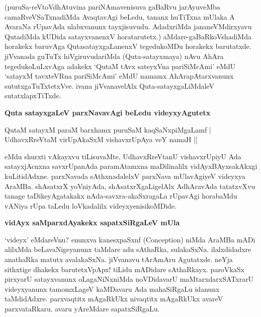 \noindent
(puruSa-reVtoVdhAtuvina pariNAmavenisuva gaBaRvu jarAyuveMba camaR\-veVSaTxnadiMda Avaqta\-vAgi beLedu, tananx huTiTxna mUlaka A AvaraNa rUpavAda ulabxvanunx tayxjisuvudu. AdadxriMda jananeVMdirx\-yavu QutadiMda kUDida satayx\-vanenxV horatarutetx.) aMdare-gaBaRkoVshadiMda horakekx baruvAga Quta\-satayx\-gaLanenxV tegedu\-koMDu horakekx barutatxde. jiVvanada guTuTx hiVgiruvudariMda (Quta-satayxmaya) nAvu AhAra tegedukoLuLxvAga adakekx `QutaM tAvx sateyxVna pariSiMcAmi' eMdU `satayxM tavxteVRna pariSiM\-cAmi'\label{87} eMdU namamx AhArapAtarxvanunx sututxgaTuTxtetxVve. ivana jiVvanavelAlx Quta-satayxgaLiMdaleV sutatx\-lapxTiTxde.

{\bigskip
\noindent
{\large\bf Quta satayxgaLeV parxNavavAgi beLedu videyxyAgutetx}}\label{page87}
\smallskip

\begin{shloka}
QutaM satayxM paraM barxhamx puruSaM kaqSaNxpiMgaLamf |\\\label{87}
UdhavxRreVtaM virUpAkaSxM vishavxrUpAya veY namaH ||
\end{shloka}

\noindent
eMdu shurxti vAkayxvu tiLisuvaMte, UdhavxRreVtanU vishavxrUpiyU Ada satayxjAcnxna savxrUpanAda para\-mAtamxna maDilinalilx vidAyxBAyxsakAkxgi kuLitidAdxne. parxNavada sAthxnadalelxV parxNava mUlavAgiyeV videyxya AraMBa. shAsatxrX yoVniyAda, shAsatxrXgaLigelAlx AdhAravAda tatatxvXvu tanage taDikeyAgatakakx nAda-savxra-akaSxra\-gaLa rUpavAgi horabaMdu vANiya rUpa taLedu loVkadalilx videyxyenisikoMDide.

{\bigskip
\noindent
{\large\bf vidAyx saMparxdAyakekx sapatxSiRgaLeV mUla}}
\medskip

\noindent
`videyx' eMdareVnu? enunxva kanesxpaSxnf ({\rm Conception}) niMda AraMBa mADi alilxMda beLavaNige\-yanunx taMdare adu sAthaRka, sulakaSxNa. ilalxdidadxre anathaRka matutx avalakaSxNa. jiVvanavu tArAmAru Agu\-tatxde. neYja sithxtige dhakekx barutetxVpApx! tiLidu mADidare sAthaRkayx. paroVkaSx pirxyarU satayxvanunx oLagaNiNx\-niMda noVDidavarU maMtarxdarxSATxrarU videyxyanunx tamomxLageV kaMDavaru Ada mahaSiRgaLu idanunx taMdi\-dAdxre. parxvaqtitx mAgaRkUkx nivaqtitx mAgaRkUkx avareV parxvataRkaru. avaru yAreMdare sapatxSiRgaLu.

